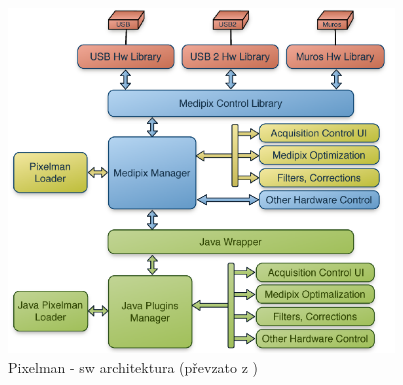 \begin{figure}[th!]
	\begin{center}
		\includegraphics[width=10.25cm]{figures/pixelman.png}
		\caption{Pixelman - sw architektura (převzato z \cite{pixelman})}
		\label{fig:det:pixelman}
	\end{center}
\end{figure}










